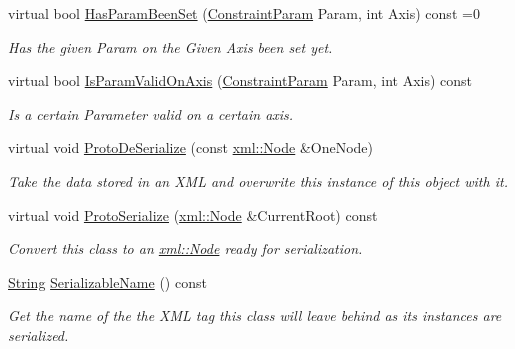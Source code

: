 \begin{DoxyCompactItemize}
virtual bool \hyperlink{classphys_1_1TypedConstraint_a849e7b91306f444cb8c73d52707a9521}{HasParamBeenSet} (\hyperlink{namespacephys_aa1e7cf2d7efcaeaeac304f711e7564e8}{ConstraintParam} Param, int Axis) const =0
\begin{DoxyCompactList}\small\item\em Has the given Param on the Given Axis been set yet. \item\end{DoxyCompactList}\item 
virtual bool \hyperlink{classphys_1_1TypedConstraint_a57f6e5053357deb43dae26a85b050207}{IsParamValidOnAxis} (\hyperlink{namespacephys_aa1e7cf2d7efcaeaeac304f711e7564e8}{ConstraintParam} Param, int Axis) const 
\begin{DoxyCompactList}\small\item\em Is a certain Parameter valid on a certain axis. \item\end{DoxyCompactList}\item 
virtual void \hyperlink{classphys_1_1TypedConstraint_aeafb306788de02bfb164806054a1c346}{ProtoDeSerialize} (const \hyperlink{classphys_1_1xml_1_1Node}{xml::Node} \&OneNode)
\begin{DoxyCompactList}\small\item\em Take the data stored in an XML and overwrite this instance of this object with it. \item\end{DoxyCompactList}\item 
virtual void \hyperlink{classphys_1_1TypedConstraint_a9cf48a2a1afb939cbd03e54ee9be3e0b}{ProtoSerialize} (\hyperlink{classphys_1_1xml_1_1Node}{xml::Node} \&CurrentRoot) const 
\begin{DoxyCompactList}\small\item\em Convert this class to an \hyperlink{classphys_1_1xml_1_1Node}{xml::Node} ready for serialization. \item\end{DoxyCompactList}\item 
\hyperlink{namespacephys_aa03900411993de7fbfec4789bc1d392e}{String} \hyperlink{classphys_1_1TypedConstraint_ad604b85a13e3e3b1c01d1c40f678b751}{SerializableName} () const 
\begin{DoxyCompactList}\small\item\em Get the name of the the XML tag this class will leave behind as its instances are serialized. \item\end{DoxyCompactList}\item 

\end{DoxyCompactItemize}
